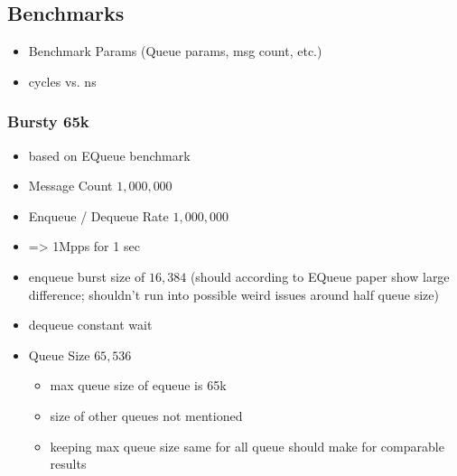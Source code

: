 \subsection{Benchmarks}
\begin{itemize}
    \item Benchmark Params (Queue params, msg count, etc.)
    \item cycles vs. ns
\end{itemize}
\subsubsection{Bursty 65k}
\begin{itemize}
    \item based on EQueue benchmark
    \item Message Count $1,000,000$
    \item Enqueue / Dequeue Rate $1,000,000$
    \item => 1Mpps for 1 sec
    \item enqueue burst size of $16,384$
          (should according to EQueue paper show large difference;
           shouldn't run into possible weird issues around half queue size)
    \item dequeue constant wait
    \item Queue Size $65,536$
        \begin{itemize}
            \item max queue size of equeue is 65k
            \item size of other queues not mentioned
            \item keeping max queue size same for all queue should make for comparable results
        \end{itemize}
\end{itemize}

